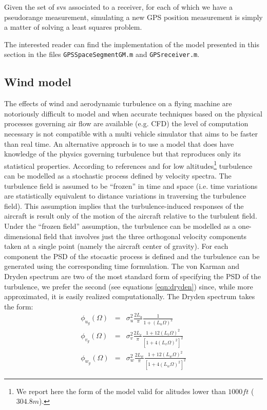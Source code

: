 \documentclass[a4paper,11pt]{report}
\begin{document}
Given the set of svs associated to a receiver, for each of which we have a pseudorange measurement, simulating a new GPS position measurement is simply a matter of solving a least squares problem. 

The interested reader can find the implementation of the model presented in this section in the files \texttt{GPSSpaceSegmentGM.m} and \texttt{GPSreceiver.m}.  

\subsection{Wind model}

The effects of wind and aerodynamic turbulence on a flying machine are notoriously difficult to model and when accurate techniques based on the physical processes governing air flow are available (e.g. CFD) the level of computation necessary is not compatible with a multi vehicle simulator that aims to be faster than real time.   
An alternative approach is to use a model that does have knowledge of the physics governing turbulence but that reproduces only its statistical properties.
According to references \cite{milf8785c} and \cite{gage2003creating} for low altitudes\footnote{We report here the form of the model valid for alitudes lower than $1000ft$ ($304.8m$).} turbulence can be modelled as a stochastic process defined by velocity spectra. The turbulence field is assumed to be ``frozen'' in time and space (i.e. time variations are statistically equivalent to distance variations in traversing the turbulence field). This assumption implies that the turbulence-induced responses of the aircraft is result only of the motion of the aircraft relative to the turbulent field.
Under the ``frozen field'' assumption, the turbulence can be modelled as a one-dimensional field that involves just the three orthogonal velocity components taken at a single point (namely the aircraft center of gravity). For each component the PSD of the stocastic process is defined and the turbulence can be generated using the corresponding time formulation.
The von Karman and Dryden spectrum are two of the most standard form of specifying the PSD of the turbulence, we prefer the second (see equations \ref{eqn:dryden}) since, while more approximated, it is easily realized computationally.
The Dryden spectrum takes the form:
\begin{eqnarray}\label{eqn:dryden}
\phi_{u_g}(\Omega) & = & \sigma^2_u \frac{2L_u}{\pi} \frac{1}{1+(L_u\Omega)^2}\\ 
\phi_{v_g}(\Omega) & = & \sigma^2_v \frac{2L_v}{\pi} \frac{1+12(L_v\Omega)^2}{\left[1+4(L_v\Omega)^2\right]^2}\\ 
\phi_{w_g}(\Omega) & = & \sigma^2_w \frac{2L_w}{\pi} \frac{1+12(L_w\Omega)^2}{\left[1+4(L_w\Omega)^2\right]^2}
\end{eqnarray}
\end{document}
